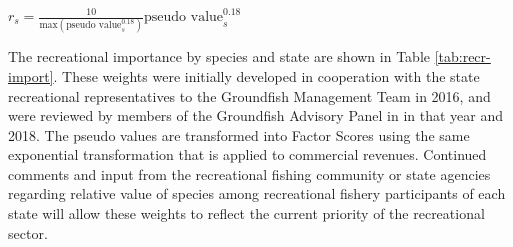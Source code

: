 \documentclass[11pt,
  english,
  a4paper,
]{article}
\begin{document}
\begin{centering}

$r_s = \frac{10}{\text{max}(\text{pseudo value}_s^{0.18})}\text{pseudo value}_s^{0.18}$  

\end{centering}


The recreational importance by species and state are shown in Table \ref{tab:recr-import}. These weights were initially developed in cooperation with the state recreational representatives to the Groundfish Management Team in 2016, and were reviewed by members of the Groundfish Advisory Panel in in that year and 2018. The pseudo values are transformed into Factor Scores using the same exponential transformation that is applied to commercial revenues. Continued comments and input from the recreational fishing community or state agencies regarding relative value of species among recreational fishery participants of each state will allow these weights to reflect the current priority of the recreational sector.

\leavevmode\tagmcend\tagstructend\par

\begingroup\fontsize{10}{12}\selectfont
\begingroup\fontsize{10}{12}\selectfont
\end{document}
